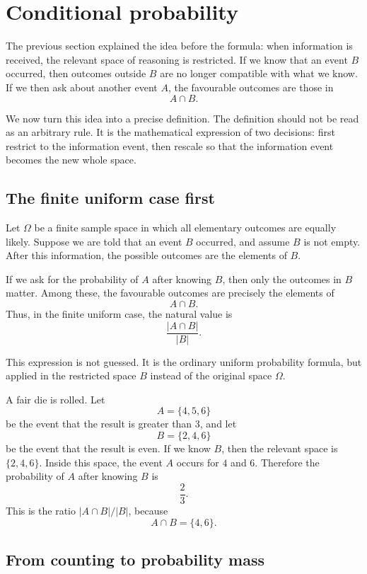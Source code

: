 \section{Conditional probability}

The previous section explained the idea before the formula: when information is
received, the relevant space of reasoning is restricted. If we know that an
event \(B\) occurred, then outcomes outside \(B\) are no longer compatible with
what we know. If we then ask about another event \(A\), the favourable outcomes
are those in
\[
A\cap B.
\]

We now turn this idea into a precise definition. The definition should not be
read as an arbitrary rule. It is the mathematical expression of two decisions:
first restrict to the information event, then rescale so that the information
event becomes the new whole space.

\subsection*{The finite uniform case first}

Let \(\Omega\) be a finite sample space in which all elementary outcomes are
equally likely. Suppose we are told that an event \(B\) occurred, and assume
\(B\) is not empty. After this information, the possible outcomes are the
elements of \(B\).

If we ask for the probability of \(A\) after knowing \(B\), then only the
outcomes in \(B\) matter. Among these, the favourable outcomes are precisely the
elements of
\[
A\cap B.
\]
Thus, in the finite uniform case, the natural value is
\[
\frac{|A\cap B|}{|B|}.
\]

This expression is not guessed. It is the ordinary uniform probability formula,
but applied in the restricted space \(B\) instead of the original space
\(\Omega\).

\begin{examplebox}
A fair die is rolled. Let
\[
A=\{4,5,6\}
\]
be the event that the result is greater than \(3\), and let
\[
B=\{2,4,6\}
\]
be the event that the result is even. If we know \(B\), then the relevant space
is \(\{2,4,6\}\). Inside this space, the event \(A\) occurs for \(4\) and
\(6\). Therefore the probability of \(A\) after knowing \(B\) is
\[
\frac{2}{3}.
\]
This is the ratio \(|A\cap B|/|B|\), because
\[
A\cap B=\{4,6\}.
\]
\end{examplebox}

\subsection*{From counting to probability mass}

